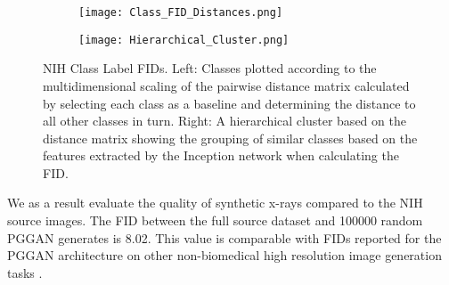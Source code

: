 \documentclass{article}
\begin{document}
\begin{figure}[!htb]
    \begin{subfigure}{0.5\textwidth}
    \texttt{[image: Class\_FID\_Distances.png]}
    \end{subfigure}
    \begin{subfigure}{0.\textwidth}
    \texttt{[image: Hierarchical\_Cluster.png]}
    \end{subfigure}
    
    \caption{NIH Class Label FIDs. Left: Classes plotted according to the multidimensional scaling of the pairwise distance matrix calculated by selecting each class as a baseline and determining the distance to all other classes in turn. Right: A hierarchical cluster based on the distance matrix showing the grouping of similar classes based on the features extracted by the Inception network when calculating the FID.}
    \label{fig:class-dist}
\end{figure}
We as a result evaluate the quality of synthetic x-rays compared to the NIH source images. The FID between the full source dataset and \num{100000} random PGGAN generates is \num{8.02}. This value is comparable with FIDs reported for the PGGAN architecture on other non-biomedical high resolution image generation tasks \cite{karrasProgressiveGrowingGANs2018}.
\end{document}
